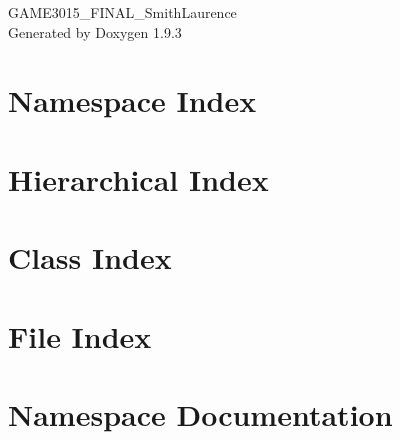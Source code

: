 \documentclass[twoside]{book}
\newcommand{\+}{\discretionary{\mbox{\scriptsize$\hookleftarrow$}}{}{}}
\newcommand{\clearemptydoublepage}{%
    \newpage{\pagestyle{empty}\cleardoublepage}%
  }
\begin{document}
  \raggedbottom
    \hypersetup{pageanchor=false,
                bookmarksnumbered=true,
                pdfencoding=unicode
               }
  \begin{titlepage}
  \vspace*{7cm}
  \begin{center}%
  {\Large GAME3015\+\_\+\+FINAL\+\_\+\+Smith\+Laurence}\\
  \vspace*{1cm}
  {\large Generated by Doxygen 1.9.3}\\
  \end{center}
  \end{titlepage}
  \clearemptydoublepage
  \tableofcontents
  \clearemptydoublepage
  \hypersetup{pageanchor=true}
\chapter{Namespace Index}

\chapter{Hierarchical Index}

\chapter{Class Index}

\chapter{File Index}

\chapter{Namespace Documentation}



\end{document}
